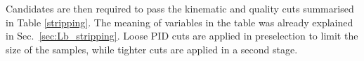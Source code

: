 Candidates are then required to pass the kinematic and quality cuts summarised in Table \ref{stripping}. 
The meaning of variables in the table was already explained in Sec.~\ref{sec:Lb_stripping}.
Loose PID cuts are applied in preselection to limit the size of the samples, while tighter cuts are applied
in a second stage.


